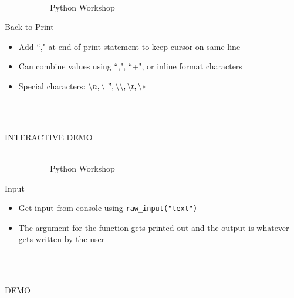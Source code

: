 \documentclass[10pt, xcolor=dvisnames]{beamer}
\begin{document}
\begin{frame}{{\tiny \ \\\vspace{-13pt} \ \ \ \ \ \ \ \ \ \ \ Python Workshop}\\ \centerline{Back to Print}}
\vspace*{-50pt}


\begin{itemize}
\item Add ``," at end of print statement to keep cursor on same line
\item Can combine values using ``,", ``+", or inline format characters
\item Special characters: $\setminus n, \setminus\ ", \setminus\setminus, \setminus t, \setminus *$
\end{itemize}


\ \\
\ \\
\centerline{INTERACTIVE DEMO}




\end{frame}





\begin{frame}{{\tiny \ \\\vspace{-13pt} \ \ \ \ \ \ \ \ \ \ \ Python Workshop}\\ \centerline{Input}}
\vspace*{-50pt}

\begin{itemize}
\item Get input from console using \texttt{raw\_input("text")}
\item The argument for the function gets printed out and the output is whatever gets written by the user
\end{itemize}




\ \\
\ \\
\centerline{DEMO}


\end{frame}
\end{document}
